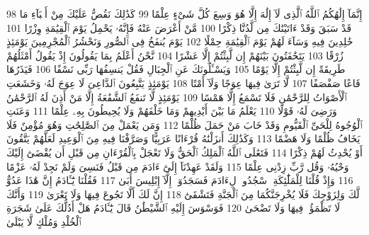{\tiny\colorbox{cl_aya}{98}} إِنَّمَآ إِلَٰهُكُمُ ٱللَّهُ ٱلَّذِى لَآ إِلَٰهَ إِلَّا هُوَ وَسِعَ كُلَّ شَىْءٍ عِلْمًا
{\tiny\colorbox{cl_aya}{99}} كَذَٰلِكَ نَقُصُّ عَلَيْكَ مِنْ أَنۢبَآءِ مَا قَدْ سَبَقَ وَقَدْ ءَاتَيْنَٰكَ مِن لَّدُنَّا ذِكْرًا
{\tiny\colorbox{cl_aya}{100}} مَّنْ أَعْرَضَ عَنْهُ فَإِنَّهُۥ يَحْمِلُ يَوْمَ ٱلْقِيَٰمَةِ وِزْرًا
{\tiny\colorbox{cl_aya}{101}} خَٰلِدِينَ فِيهِ وَسَآءَ لَهُمْ يَوْمَ ٱلْقِيَٰمَةِ حِمْلًا
{\tiny\colorbox{cl_aya}{102}} يَوْمَ يُنفَخُ فِى ٱلصُّورِ وَنَحْشُرُ ٱلْمُجْرِمِينَ يَوْمَئِذٍ زُرْقًا
{\tiny\colorbox{cl_aya}{103}} يَتَخَٰفَتُونَ بَيْنَهُمْ إِن لَّبِثْتُمْ إِلَّا عَشْرًا
{\tiny\colorbox{cl_aya}{104}} نَّحْنُ أَعْلَمُ بِمَا يَقُولُونَ إِذْ يَقُولُ أَمْثَلُهُمْ طَرِيقَةً إِن لَّبِثْتُمْ إِلَّا يَوْمًا
{\tiny\colorbox{cl_aya}{105}} وَيَسْـَٔلُونَكَ عَنِ ٱلْجِبَالِ فَقُلْ يَنسِفُهَا رَبِّى نَسْفًا
{\tiny\colorbox{cl_aya}{106}} فَيَذَرُهَا قَاعًا صَفْصَفًا
{\tiny\colorbox{cl_aya}{107}} لَّا تَرَىٰ فِيهَا عِوَجًا وَلَآ أَمْتًا
{\tiny\colorbox{cl_aya}{108}} يَوْمَئِذٍ يَتَّبِعُونَ ٱلدَّاعِىَ لَا عِوَجَ لَهُۥ وَخَشَعَتِ ٱلْأَصْوَاتُ لِلرَّحْمَٰنِ فَلَا تَسْمَعُ إِلَّا هَمْسًا
{\tiny\colorbox{cl_aya}{109}} يَوْمَئِذٍ لَّا تَنفَعُ ٱلشَّفَٰعَةُ إِلَّا مَنْ أَذِنَ لَهُ ٱلرَّحْمَٰنُ وَرَضِىَ لَهُۥ قَوْلًا
{\tiny\colorbox{cl_aya}{110}} يَعْلَمُ مَا بَيْنَ أَيْدِيهِمْ وَمَا خَلْفَهُمْ وَلَا يُحِيطُونَ بِهِۦ عِلْمًا
{\tiny\colorbox{cl_aya}{111}} وَعَنَتِ ٱلْوُجُوهُ لِلْحَىِّ ٱلْقَيُّومِ وَقَدْ خَابَ مَنْ حَمَلَ ظُلْمًا
{\tiny\colorbox{cl_aya}{112}} وَمَن يَعْمَلْ مِنَ ٱلصَّٰلِحَٰتِ وَهُوَ مُؤْمِنٌ فَلَا يَخَافُ ظُلْمًا وَلَا هَضْمًا
{\tiny\colorbox{cl_aya}{113}} وَكَذَٰلِكَ أَنزَلْنَٰهُ قُرْءَانًا عَرَبِيًّا وَصَرَّفْنَا فِيهِ مِنَ ٱلْوَعِيدِ لَعَلَّهُمْ يَتَّقُونَ أَوْ يُحْدِثُ لَهُمْ ذِكْرًا
{\tiny\colorbox{cl_aya}{114}} فَتَعَٰلَى ٱللَّهُ ٱلْمَلِكُ ٱلْحَقُّ وَلَا تَعْجَلْ بِٱلْقُرْءَانِ مِن قَبْلِ أَن يُقْضَىٰٓ إِلَيْكَ وَحْيُهُۥ وَقُل رَّبِّ زِدْنِى عِلْمًا
{\tiny\colorbox{cl_aya}{115}} وَلَقَدْ عَهِدْنَآ إِلَىٰٓ ءَادَمَ مِن قَبْلُ فَنَسِىَ وَلَمْ نَجِدْ لَهُۥ عَزْمًا
{\tiny\colorbox{cl_aya}{116}} وَإِذْ قُلْنَا لِلْمَلَٰٓئِكَةِ ٱسْجُدُوا۟ لِءَادَمَ فَسَجَدُوٓا۟ إِلَّآ إِبْلِيسَ أَبَىٰ
{\tiny\colorbox{cl_aya}{117}} فَقُلْنَا يَٰٓـَٔادَمُ إِنَّ هَٰذَا عَدُوٌّ لَّكَ وَلِزَوْجِكَ فَلَا يُخْرِجَنَّكُمَا مِنَ ٱلْجَنَّةِ فَتَشْقَىٰٓ
{\tiny\colorbox{cl_aya}{118}} إِنَّ لَكَ أَلَّا تَجُوعَ فِيهَا وَلَا تَعْرَىٰ
{\tiny\colorbox{cl_aya}{119}} وَأَنَّكَ لَا تَظْمَؤُا۟ فِيهَا وَلَا تَضْحَىٰ
{\tiny\colorbox{cl_aya}{120}} فَوَسْوَسَ إِلَيْهِ ٱلشَّيْطَٰنُ قَالَ يَٰٓـَٔادَمُ هَلْ أَدُلُّكَ عَلَىٰ شَجَرَةِ ٱلْخُلْدِ وَمُلْكٍ لَّا يَبْلَىٰ

